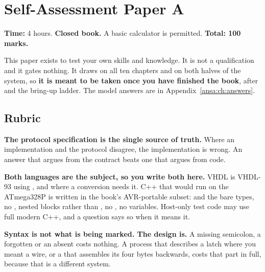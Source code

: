 
\chapter{Self-Assessment Paper A}
\label{exa:ch:paper}

\noindent\textbf{Time:} 4 hours. \textbf{Closed book.} A basic calculator is permitted.
\textbf{Total: 100 marks.}

This paper exists to test your own skills and knowledge. It is not a qualification and it gates
nothing. It draws on all ten chapters and on both halves of the system, so \textbf{it is meant to be
taken once you have finished the book}, after  and the bring-up ladder. The model
answers are in Appendix~\ref{ansa:ch:answers}.

\section*{Rubric}
\textbf{The protocol specification is the single source of truth.} Where an implementation and the
protocol disagree, the implementation is wrong. An answer that argues from the contract beats one
that argues from code.

\textbf{Both languages are the subject, so you write both here.} VHDL is VHDL-93 using
, and  where a conversion needs it. C++ that would
run on the ATmega328P is written in the book's AVR-portable subset:  and the bare
types, no , nested  blocks rather than , no
\code{[[nodiscard]]}, no  variables. Host-only test code may use full modern C++, and a
question says so when it means it.

\textbf{Syntax is not what is being marked. The design is.} A missing semicolon, a forgotten
 or an absent  costs nothing. A process that describes a latch where you
meant a wire, or a  that assembles its four bytes backwards, costs that part in full,
because that is a different system.

